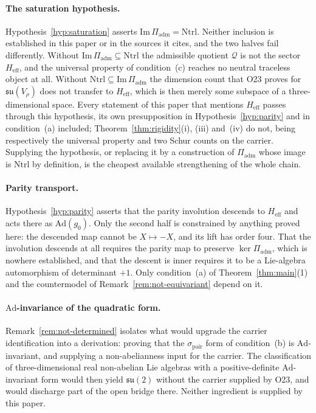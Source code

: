 \documentclass[11pt,a4paper]{article}
\theoremstyle{remark}
\begin{document}
  \paragraph{The saturation hypothesis.}
  Hypothesis~\ref{hyp:saturation} asserts $\mathrm{Im}\,\Pi_{\mathrm{adm}} = \mathrm{Ntrl}$.
  Neither inclusion is established in this paper or in the sources it cites, and the two halves fail
  differently.
  Without $\mathrm{Im}\,\Pi_{\mathrm{adm}} \subseteq \mathrm{Ntrl}$ the admissible quotient
  $\mathcal{Q}$ is not the sector $H_{\mathrm{eff}}$, and the universal property of
  condition~(c) reaches no neutral traceless object at all.
  Without $\mathrm{Ntrl} \subseteq \mathrm{Im}\,\Pi_{\mathrm{adm}}$ the dimension count that O23
  proves for $\mathfrak{su}(V_\rho)$ does not transfer to $H_{\mathrm{eff}}$, which is then merely
  some subspace of a three-dimensional space.
  Every statement of this paper that mentions $H_{\mathrm{eff}}$ passes through this hypothesis,
  its own presupposition in Hypothesis~\ref{hyp:parity} and in condition~(a) included;
  Theorem~\ref{thm:rigidity}(i), (iii) and~(iv) do not, being respectively the universal property
  and two Schur counts on the carrier.
  Supplying the hypothesis, or replacing it by a construction of $\Pi_{\mathrm{adm}}$ whose image is
  $\mathrm{Ntrl}$ by definition, is the cheapest available strengthening of the whole chain.

  \paragraph{Parity transport.}
  Hypothesis~\ref{hyp:parity} asserts that the parity involution descends to $H_{\mathrm{eff}}$ and
  acts there as $\mathrm{Ad}(g_0)$.
  Only the second half is constrained by anything proved here: the descended map cannot be
  $X \mapsto -X$, and its lift has order four.
  That the involution descends at all requires the parity map to preserve
  $\ker \Pi_{\mathrm{adm}}$, which is nowhere established, and that the descent is inner requires it
  to be a Lie-algebra automorphism of determinant $+1$.
  Only condition~(a) of Theorem~\ref{thm:main}(1) and the countermodel of
  Remark~\ref{rem:not-equivariant} depend on it.

  \paragraph{$\mathrm{Ad}$-invariance of the quadratic form.}
  Remark~\ref{rem:not-determined} isolates what would upgrade the carrier identification into a
  derivation: proving that the $\sigma_{\mathrm{pair}}$ form of condition~(b) is
  $\mathrm{Ad}$-invariant, and supplying a non-abelianness input for the carrier.
  The classification of three-dimensional real non-abelian Lie algebras with a positive-definite
  $\mathrm{Ad}$-invariant form would then yield $\mathfrak{su}(2)$ without the carrier supplied by
  O23, and would discharge part of the open bridge there.
  Neither ingredient is supplied by this paper.
\end{document}
